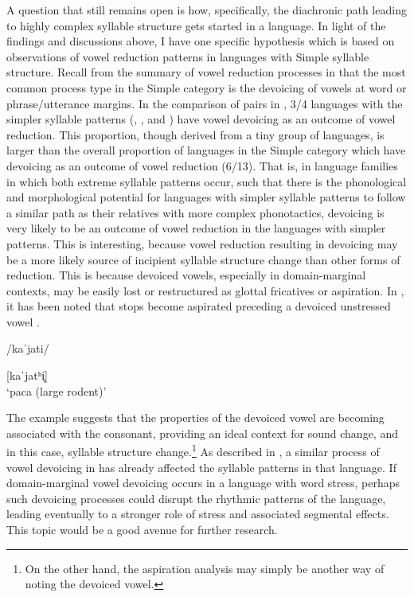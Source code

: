   A question that still remains open is how, specifically, the diachronic path leading to highly complex syllable structure gets started in a language. In light of the findings and discussions above, I have one specific hypothesis which is based on observations of vowel reduction patterns in languages with Simple syllable structure. Recall from the summary of vowel reduction processes in  that the most common process type in the Simple category is the devoicing of vowels at word or phrase/utterance margins. In the comparison of pairs in , 3/4 languages with the simpler syllable patterns (, , and ) have vowel devoicing as an outcome of vowel reduction. This proportion, though derived from a tiny group of languages, is larger than the overall proportion of languages in the Simple category which have devoicing as an outcome of vowel reduction (6/13). That is, in language families in which both extreme syllable patterns occur, such that there is the phonological and morphological potential for languages with simpler syllable patterns to follow a similar path as their relatives with more complex phonotactics, devoicing is very likely to be an outcome of vowel reduction in the languages with simpler patterns. This is interesting, because vowel reduction resulting in devoicing may be a more likely source of incipient syllable structure change than other forms of reduction. This is because devoiced vowels, especially in domain-marginal contexts, may be easily lost or restructured as glottal fricatives or aspiration. In , it has been noted that stops become aspirated preceding a devoiced unstressed vowel .

\ea\label{ex:8.6}

/kaˈjati/

[kaˈjatʰi̥]\\
\glt ‘paca (large rodent)’
\citep[60-1]{Facundes2000} 
\z

  The  example suggests that the properties of the devoiced vowel are becoming associated with the consonant, providing an ideal context for sound change, and in this case, syllable structure change.\footnote{{On the other hand, the aspiration analysis may simply be another way of noting the devoiced vowel.}} As described in , a similar process of vowel devoicing in  has already affected the syllable patterns in that language. If domain-marginal vowel devoicing occurs in a language with word stress, perhaps such devoicing processes could disrupt the rhythmic patterns of the language, leading eventually to a stronger role of stress and associated segmental effects. This topic would be a good avenue for further research.

